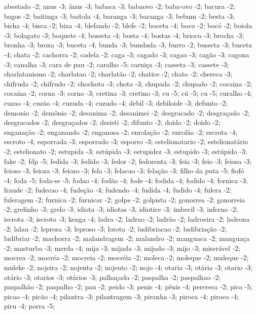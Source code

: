 abestado -2;
anus -3;
ânus -3;
babaca -3;
babaovo -2;
baba-ovo -2;
bacura -2;
bagos -2;
baitinga -3;
baitola -4;
baranga -3;
baranga -3;
bebum -2;
besta -3;
bicha -4;
bisca -2;
bixa -4;
blefando -2;
blefe -2;
boceta -4;
boco -2;
bocó -2;
boiola -3;
bolagato -3;
boquete -4;
bosseta -4;
bosta -4;
bostas -4;
brioco -3;
brocha -3;
bronha -3;
broxa -3;
buceta -4;
bunda -3;
bunduda -3;
burro -2;
busseta -3;
buceta -4;
chata -2;
cachorra -2;
cadela -2;
caga -3;
cagado -3;
cagao -3;
cagão -3;
cagona -3;
canalha -3;
cara de pau -2;
caralho -5;
carniça -3;
casseta -3;
cassete -3;
charlatanismo -2;
charlatao -2;
charlatão -2;
chatice -2;
chato -2;
chereca -3;
chifruda -2;
chifrudo -2;
chochota -3;
chota -3;
chupada -2;
chupado -2;
cocaina -2;
cocaína -2;
corna -3;
corno -3;
cretina -3;
cretino -3;
cu -5;
cú -5;
cu -5;
curalho -4;
cuzao -4;
cuzão -4;
cuzuda -4;
cuzudo -4;
debil -3;
debiloide -3;
defunto -2;
demonio -2;
demônio -2;
desanima -2;
desanimei -2;
desgracado -2;
desgraçado -2;
desgracados -2;
desgraçados -2;
desisti -2;
difunto -2;
doida -2;
doido -2;
enganação -2;
enganando -2;
enganosa -2;
enrolação -2;
enrolão -2;
escrota -4;
escroto -4;
esporrada -3;
esporrado -3;
esporro -3;
estelionatario -2;
estelionatário -2;
estelionato -2;
estupida -3;
estúpida -3;
estupidez -3;
estupido -3;
estúpido -3;
fake -2;
fdp -5;
fedida -3;
fedido -3;
fedor -2;
fedorenta -3;
feia -3;
feio -3;
feiosa -3;
feioso -3;
feioza -3;
feiozo -3;
fela -3;
felacao -3;
felação -3;
filho da puta -5;
fiofó -4;
foda -5;
foda-se -5;
fodao -4;
fodão -4;
fode -4;
fodida -4;
fodido -4;
fornica -3;
fraude -2;
fudecao -4;
fudeção -4;
fudendo -4;
fudida -4;
fudido -4;
fulera -2;
fuleragem -2;
furnica -2;
furnicar -2;
golpe -2;
golpista -2;
gonorrea -2;
gonorreia -2;
grelinho -3;
grelo -3;
idiota -3;
idiotas -3;
idiotice -3;
imbecil -3;
inferno -2;
iscrota -3;
iscroto -3;
kenga -4;
ladra -2;
ladrao -2;
ladrão -2;
ladroeira -2;
ladrona -2;
lalau -2;
leprosa -3;
leproso -3;
lorota -2;
ludibriacao -2;
ludibriação -2;
ludibriar -2;
machorra -2;
malandragem -2;
malandro -2;
manguaca -2;
manguaça -2;
masturba -3;
merda -4;
mija -3;
mijada -3;
mijado -3;
mijo -3;
miserável -2;
mocrea -2;
mocréa -2;
mocreia -2;
mocréia -2;
moleca -2;
moleque -2;
muleque -2;
muleke -2;
nojeira -2;
nojenta -2;
nojento -2;
nojo -4;
otaria -3;
otária -3;
otario -3;
otário -3;
otarios -3;
otários -3;
palhaçada -2;
paspalha -2;
paspalhao -2;
paspalhão -2;
paspalho -2;
pau -2;
peido -3;
penis -4;
pênis -4;
perereca -2;
pica -5;
picao -4;
picão -4;
pilantra -3;
pilantragem -3;
piranha -3;
piroca -4;
piroco -4;
piru -4;
porra -5;
